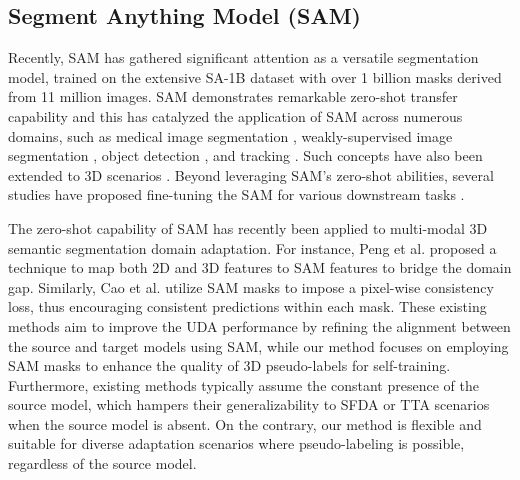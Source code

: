 \subsection{Segment Anything Model (SAM)}

Recently, SAM \cite{peng2023sam, ravi2024sam} has gathered significant attention as a versatile segmentation model, trained on the extensive SA-1B dataset with over 1 billion masks derived from 11 million images. SAM demonstrates remarkable zero-shot transfer capability and this has catalyzed the application of SAM across numerous domains, such as medical image segmentation \cite{huang2023push, huang2024segment}, weakly-supervised image segmentation \cite{chen2023segment, he2024weakly}, object detection \cite{yang2023sam3d}, and tracking \cite{yang2023track, cheng2023segment}. Such concepts have also been extended to 3D scenarios \cite{liu2024segment}. Beyond leveraging SAM's zero-shot abilities, several studies have proposed fine-tuning the SAM for various downstream tasks \cite{ma2024segment, zhang2023personalize, wu2023medical}.

The zero-shot capability of SAM has recently been applied to multi-modal 3D semantic segmentation domain adaptation. For instance, Peng et al. \cite{peng2023sam} proposed a technique to map both 2D and 3D features to SAM features to bridge the domain gap. Similarly, Cao et al. \cite{cao2024mopa} utilize SAM masks to impose a pixel-wise consistency loss, thus encouraging consistent predictions within each mask. These existing methods aim to improve the UDA performance by refining the alignment between the source and target models using SAM, while our method focuses on employing SAM masks to enhance the quality of 3D pseudo-labels for self-training. Furthermore, existing methods typically assume the constant presence of the source model, which hampers their generalizability to SFDA or TTA scenarios when the source model is absent. On the contrary, our method is flexible and suitable for diverse adaptation scenarios where pseudo-labeling is possible, regardless of the source model.